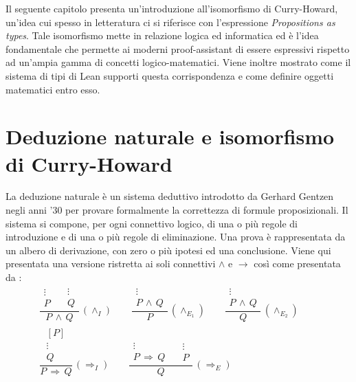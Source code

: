 Il seguente capitolo presenta un'introduzione all'isomorfismo di Curry-Howard, un'idea cui spesso in letteratura ci si riferisce con l'espressione \emph{Propositions as types}. Tale isomorfismo mette in relazione logica ed informatica ed è l'idea fondamentale che permette ai moderni proof-assistant di essere espressivi rispetto ad un'ampia gamma di concetti logico-matematici. Viene inoltre mostrato come il sistema di tipi di Lean supporti questa corrispondenza e come definire oggetti matematici entro esso.

\section{Deduzione naturale e isomorfismo di Curry-Howard} \label{natden}
La deduzione naturale è un sistema deduttivo  introdotto da Gerhard Gentzen negli anni '30 per provare formalmente la correttezza di formule proposizionali. Il sistema si compone, per ogni connettivo logico, di una o più regole di introduzione e di una o più regole di eliminazione. Una prova è rappresentata da un albero di derivazione, con zero o più ipotesi ed una conclusione. Viene qui presentata una versione ristretta ai soli connettivi $\wedge$ e $\to$ così come presentata da \cite{Girard1989-GIRPAT}:
\vspace{0.2cm}
$$
\begin{array}{ccc}
\dfrac{\begin{array}{c} \vdots \\ P \end{array} \quad \begin{array}{c} \vdots \\ Q \end{array}}{P \,\wedge\, Q}\,(\wedge_I) \qquad
\dfrac{\begin{array}{c} \vdots \\ P \,\wedge\, Q \end{array}}{P}\,(\wedge_{E_1}) \qquad
\dfrac{\begin{array}{c} \vdots \\ P \,\wedge\, Q \end{array}}{Q}\,(\wedge_{E_2}) \qquad \\
\dfrac{\begin{array}{c}[P] \\ \vdots \\ Q\end{array}}{P \,\Rightarrow\, Q}\,(\Rightarrow_{I}) \qquad
\dfrac{\begin{array}{c} \vdots \\ P \,\Rightarrow\, Q \end{array} \quad \begin{array}{c} \vdots \\ P \end{array}}{Q}\,(\Rightarrow_E)
\end{array}
$$
